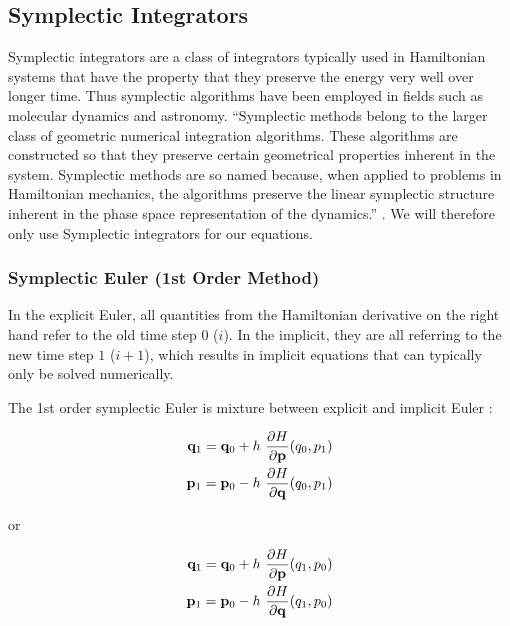 \subsection{Symplectic Integrators}
Symplectic integrators are a class of integrators typically used in Hamiltonian systems that have the property that they preserve the energy very well over longer time. Thus symplectic algorithms have been employed in fields such as molecular dynamics and astronomy. ``Symplectic methods belong to the larger class of geometric numerical integration algorithms. These algorithms are constructed so that they preserve certain geometrical properties inherent in the system. Symplectic methods are so named because, when applied to problems in Hamiltonian mechanics, the algorithms preserve the linear symplectic structure inherent in the phase space representation of the dynamics.'' \cite{Donnelly2005}. We will therefore only use Symplectic integrators for our equations.


\subsubsection{Symplectic Euler (1st Order Method)}
In the explicit Euler, all quantities from the Hamiltonian derivative on the right hand refer to the old time step \(0\) ($i$). In the implicit, they are all referring to the new time step \(1\) ($i+1$), which results in implicit equations that can typically only be solved numerically.

The 1st order symplectic Euler is mixture between explicit and implicit Euler \cite{Hairer}:

\begin{equation}
    \begin{split} \label{eq:symplectic-euler1}
        \mathbf{q}_1 = \mathbf{q}_0 + h \operatorname{}\frac{\partial H}{\partial \mathbf{p}}(q_0, p_1) \\
        \mathbf{p}_1 = \mathbf{p}_0 - h \operatorname{}\frac{\partial H}{\partial \mathbf{q}}(q_0, p_1)
    \end{split}
\end{equation}

or

\begin{equation}
    \begin{split} \label{eq:symplectic-euler2}
        \mathbf{q}_1 = \mathbf{q}_0 + h \operatorname{}\frac{\partial H}{\partial \mathbf{p}}(q_1, p_0) \\
        \mathbf{p}_1 = \mathbf{p}_0 - h \operatorname{}\frac{\partial H}{\partial \mathbf{q}}(q_1, p_0)
    \end{split}
\end{equation}


